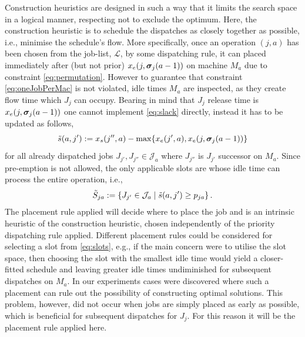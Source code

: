\documentclass[smallextended]{svjour3}
\begin{document}
Construction heuristics are designed in such a way that it limits the search 
space in a logical manner, respecting not to exclude the optimum. Here, the 
construction heuristic is to schedule the dispatches as closely together as 
possible, i.e., minimise the schedule's flow. 
More specifically, once an operation $(j,a)$ has been chosen from the job-list, 
$\mathcal{L}$, by some dispatching rule, it can placed immediately after (but 
not prior) $x_e(j,\bm \sigma_j(a-1))$ on machine $M_a$ due to constraint 
\cref{eq:permutation}. 
However to guarantee that constraint \cref{eq:oneJobPerMac} is not violated, 
idle times $M_a$ are inspected, as they create flow time  which $J_j$ can 
occupy. Bearing in mind that $J_j$ release time is $x_e(j,\bm \sigma_j(a-1))$ one 
cannot implement \cref{eq:slack} directly, instead it has to be updated as 
follows,
\begin{equation}
\tilde{s}(a,j'):= x_s(j'',a)-\max\{x_e(j',a),x_e(j,\vsigma_j(a-1))\} %
\end{equation}
for all already dispatched jobs $J_{j'},J_{j''}\in \mathcal{J}_a$ where 
$J_{j''}$ is $J_{j'}$ successor on $M_a$. Since pre-emption is not allowed, the 
only applicable slots are whose idle time can process the entire operation, 
i.e.,
\begin{equation}
\tilde{S}_{ja} := \left\{J_{j'}\in \mathcal{J}_a\;\middle|\;\tilde{s}(a,j')\geq p_{ja} 
\right\}\label{eq:slots}.
\end{equation} 
The placement rule applied will decide where to place the job and 
is an intrinsic heuristic of the construction heuristic, chosen independently 
of the priority dispatching rule applied. 
Different placement rules could be considered for selecting a slot from 
\cref{eq:slots}, e.g., if the main concern were to utilise the slot space, then 
choosing the slot with the smallest idle time would yield a closer-fitted 
schedule and leaving greater idle times undiminished for subsequent dispatches 
on $M_a$.
In our experiments cases were discovered where such a placement can rule out 
the possibility of constructing optimal solutions.
This problem, however, did not occur when jobs are simply placed as early as 
possible, which is beneficial for subsequent dispatches for $J_j$. 
For this reason it will be the placement rule applied here.
\end{document}
